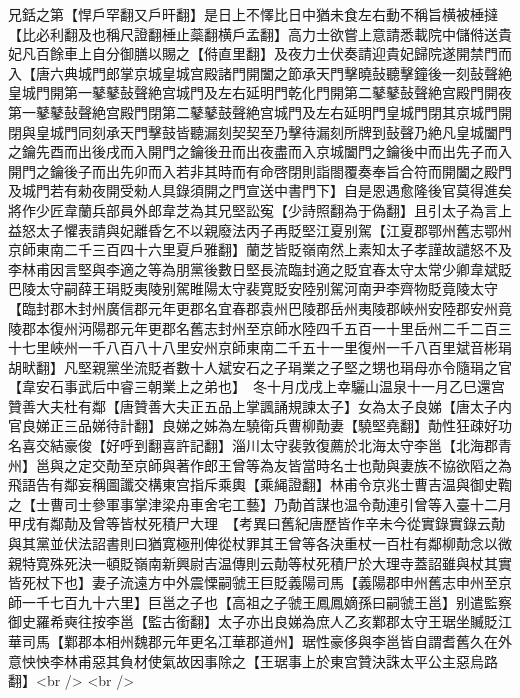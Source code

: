 兄銛之第【悍戶罕翻又戶旰翻】是日上不懌比日中猶未食左右動不稱旨横被棰撻【比必利翻及也稱尺證翻棰止蘂翻横戶孟翻】高力士欲嘗上意請悉載院中儲偫送貴妃凡百餘車上自分御膳以賜之【偫直里翻】及夜力士伏奏請迎貴妃歸院遂開禁門而入【唐六典城門郎掌京城皇城宫殿諸門開闔之節承天門擊曉鼔聽擊鐘後一刻鼔聲絶皇城門開第一鼕鼕鼔聲絶宫城門及左右延明門乾化門開第二鼕鼕鼔聲絶宫殿門開夜第一鼕鼕鼔聲絶宫殿門閉第二鼕鼕鼓聲絶宫城門及左右延明門皇城門閉其京城門開閉與皇城門同刻承天門擊鼓皆聽漏刻契契至乃擊待漏刻所牌到鼔聲乃絶凡皇城闔門之鑰先酉而出後戌而入開門之鑰後丑而出夜盡而入京城闔門之鑰後中而出先子而入開門之鑰後子而出先卯而入若非其時而有命啓閉則詣閤覆奏奉旨合符而開闔之殿門及城門若有勑夜開受勑人具錄須開之門宣送中書門下】自是恩遇愈隆後官莫得進矣　將作少匠韋蘭兵部員外郎韋芝為其兄堅訟寃【少詩照翻為于偽翻】且引太子為言上益怒太子懼表請與妃離昏乞不以親廢法丙子再貶堅江夏别駕【江夏郡鄂州舊志鄂州京師東南二千三百四十六里夏戶雅翻】蘭芝皆貶嶺南然上素知太子孝謹故譴怒不及李林甫因言堅與李適之等為朋黨後數日堅長流臨封適之貶宜春太守太常少卿韋斌貶巴陵太守嗣薛王琄貶夷陵别駕睢陽太守裴寛貶安陸别駕河南尹李齊物貶竟陵太守【臨封郡木封州廣信郡元年更郡名宜春郡袁州巴陵郡岳州夷陵郡峽州安陸郡安州竟陵郡本復州沔陽郡元年更郡名舊志封州至京師水陸四千五百一十里岳州二千二百三十七里峽州一千八百八十八里安州京師東南二千五十一里復州一千八百里斌音彬琄胡畎翻】凡堅親黨坐流貶者數十人斌安石之子琄業之子堅之甥也琄母亦令隨琄之官【韋安石事武后中睿三朝業上之弟也】　冬十月戊戌上幸驪山温泉十一月乙巳還宫　贊善大夫杜有鄰【唐贊善大夫正五品上掌諷誦規諫太子】女為太子良娣【唐太子内官良娣正三品娣待計翻】良娣之姊為左驍衛兵曹柳勣妻【驍堅堯翻】勣性狂疎好功名喜交結豪俊【好呼到翻喜許記翻】淄川太守裴敦復薦於北海太守李邕【北海郡青州】邕與之定交勣至京師與著作郎王曾等為友皆當時名士也勣與妻族不協欲䧟之為飛語告有鄰妄稱圖讖交構東宫指斥乘輿【乘䋲證翻】林甫令京兆士曹吉温與御史鞫之【士曹司士參軍事掌津梁舟車舍宅工藝】乃勣首謀也温令勣連引曾等入臺十二月甲戌有鄰勣及曾等皆杖死積尸大理　【考異曰舊紀唐歷皆作辛未今從實錄實錄云勣與其黨並伏法詔書則曰猶寛極刑俾從杖罪其王曾等各決重杖一百杜有鄰柳勣念以微親特寛殊死決一頓貶嶺南新興尉吉温傳則云勣等杖死積尸於大理寺蓋詔雖與杖其實皆死杖下也】妻子流遠方中外震慄嗣虢王巨貶義陽司馬【義陽郡申州舊志申州至京師一千七百九十六里】巨邕之子也【高祖之子虢王鳳鳳嫡孫曰嗣虢王邕】别遣監察御史羅希奭往按李邕【監古銜翻】太子亦出良娣為庶人乙亥鄴郡太守王琚坐贓貶江華司馬【鄴郡本相州魏郡元年更名冮華郡道州】琚性豪侈與李邕皆自謂耆舊久在外意怏怏李林甫惡其負材使氣故因事除之【王琚事上於東宫贊決誅太平公主惡烏路翻】<br />
<br />
